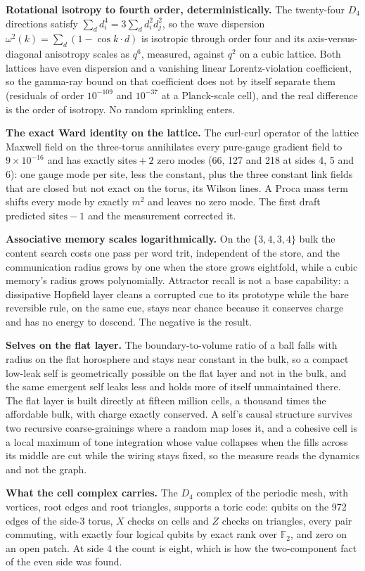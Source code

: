 \textbf{Rotational isotropy to fourth order, deterministically.} The twenty-four $D_4$ directions satisfy
$\sum_d d_i^4 = 3\sum_d d_i^2 d_j^2$, so the wave dispersion $\omega^2(k) = \sum_d (1 - \cos k\cdot d)$ is isotropic
through order four and its axis-versus-diagonal anisotropy scales as $q^6$, measured, against $q^2$ on a cubic
lattice. Both lattices have even dispersion and a vanishing linear Lorentz-violation coefficient, so the gamma-ray
bound on that coefficient does not by itself separate them (residuals of order $10^{-109}$ and $10^{-37}$ at a
Planck-scale cell), and the real difference is the order of isotropy. No random sprinkling enters.

\textbf{The exact Ward identity on the lattice.} The curl-curl operator of the lattice Maxwell field on the
three-torus annihilates every pure-gauge gradient field to $9\times10^{-16}$ and has exactly $\text{sites} + 2$
zero modes (66, 127 and 218 at sides 4, 5 and 6): one gauge mode per site, less the constant, plus the three
constant link fields that are closed but not exact on the torus, its Wilson lines. A Proca mass term shifts every
mode by exactly $m^2$ and leaves no zero mode. The first draft predicted $\text{sites} - 1$ and the measurement
corrected it.

\textbf{Associative memory scales logarithmically.} On the $\{3,4,3,4\}$ bulk the content search costs one pass per
word trit, independent of the store, and the communication radius grows by one when the store grows eightfold, while
a cubic memory's radius grows polynomially. Attractor recall is not a base capability: a dissipative Hopfield layer
cleans a corrupted cue to its prototype while the bare reversible rule, on the same cue, stays near chance because
it conserves charge and has no energy to descend. The negative is the result.

\textbf{Selves on the flat layer.} The boundary-to-volume ratio of a ball falls with radius on the flat horosphere
and stays near constant in the bulk, so a compact low-leak self is geometrically possible on the flat layer and not
in the bulk, and the same emergent self leaks less and holds more of itself unmaintained there. The flat layer is
built directly at fifteen million cells, a thousand times the affordable bulk, with charge exactly conserved. A
self's causal structure survives two recursive coarse-grainings where a random map loses it, and a cohesive cell is
a local maximum of tone integration whose value collapses when the fills across its middle are cut while the wiring
stays fixed, so the measure reads the dynamics and not the graph.

\textbf{What the cell complex carries.} The $D_4$ complex of the periodic mesh, with vertices, root edges and root
triangles, supports a toric code: qubits on the 972 edges of the side-3 torus, $X$ checks on cells and $Z$ checks on
triangles, every pair commuting, with exactly four logical qubits by exact rank over $\mathbb{F}_2$, and zero on an
open patch. At side 4 the count is eight, which is how the two-component fact of the even side was found.

